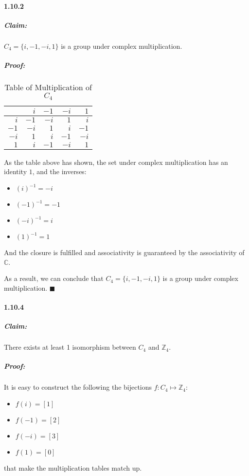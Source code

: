 \documentclass[11pt]{article}
\begin{document}
	\paragraph{1.10.2}
		\subparagraph{Claim:} $C_4 = \{i, -1, -i, 1\}$ is a group under complex multiplication.
		\subparagraph{Proof:}
			\begin{table}[!hbp]
    \centering
    \begin{tabular}{r || r | r | r | r}
        
        & $i$ & $-1$ & $-i$ & $1$\\
        \hline
        \hline
           
           $i$ & $-1$ & $-i$ & $1$ & $i$\\
        \hline
           $-1$ & $-i$ & $1$ & $i$ & $-1$\\
        \hline
           $-i$ & $1$ & $i$ & $-1$ & $-i$\\
		\hline
           $1$ & $i$ & $-1$ & $-i$ & $1$\\
    \end{tabular}
    \caption{Table of Multiplication of $C_4$}
\end{table}

	As the table above has shown, the set under complex multiplication has an identity $1$, and the inverses:
		\begin{itemize}
			\item $(i)^{-1} = -i$
			\item $(-1)^{-1} = -1$
			\item $(-i)^{-1} = i$
			\item $(1)^{-1} = 1$
		\end{itemize}
	And the closure is fulfilled and associativity is guaranteed by the associativity of $\mathbb{C}$.
	
	As a result, we can conclude that $C_4 = \{i, -1, -i, 1\}$ is a group under complex multiplication. $\blacksquare$
	\paragraph{1.10.4} 
		\subparagraph{Claim:} There exists at least 1 isomorphism between $C_4$ and $\mathbb{Z}_4$.
		\subparagraph{Proof:}
		It is easy to construct the following the bijections $f : C_4 \mapsto \mathbb{Z}_4$:
		\begin{itemize}
				\item $f(i) = [1]$
				\item $f(-1) = [2]$
				\item $f(-i) = [3]$
				\item $f(1) = [0]$
		\end{itemize}
		that make the multiplication tables match up.
		
\end{document}
